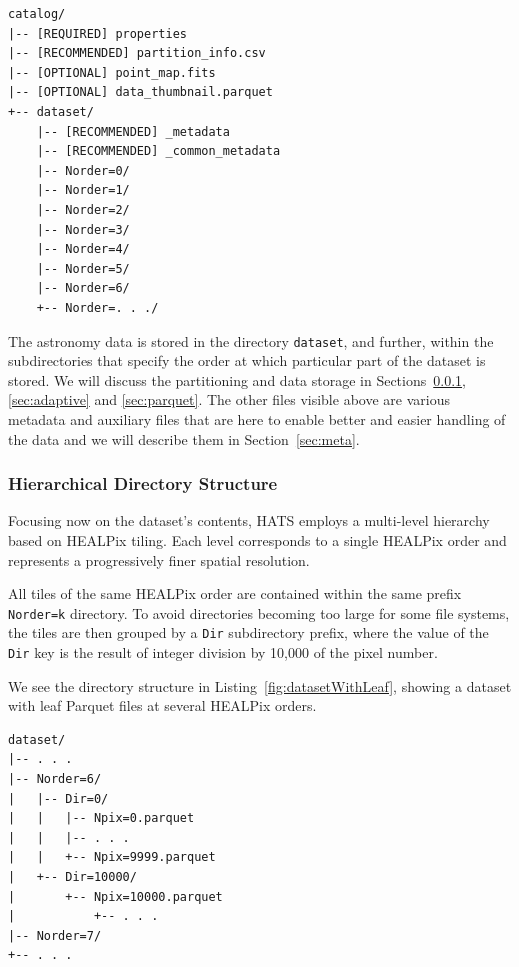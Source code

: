 \documentclass[11pt,a4paper]{ivoa}
\begin{document}
\begin{minipage}{\linewidth}
\begin{lstlisting}[caption=Example catalog directory contents, label=fig:exampleCatalogStructure]
catalog/
|-- [REQUIRED] properties
|-- [RECOMMENDED] partition_info.csv
|-- [OPTIONAL] point_map.fits
|-- [OPTIONAL] data_thumbnail.parquet
+-- dataset/
    |-- [RECOMMENDED] _metadata
    |-- [RECOMMENDED] _common_metadata
    |-- Norder=0/
    |-- Norder=1/
    |-- Norder=2/
    |-- Norder=3/
    |-- Norder=4/
    |-- Norder=5/
    |-- Norder=6/
    +-- Norder=. . ./
\end{lstlisting}
\end{minipage}

The astronomy data is stored in the directory \texttt{dataset}, and further, within the subdirectories that specify the order at which particular part of the dataset is stored. 
We will discuss the partitioning and data storage in Sections~\ref{sec:hierarchical}, \ref{sec:adaptive} and \ref{sec:parquet}. 
The other files visible above are various metadata and auxiliary files that are here to enable better and easier handling of the data and we will describe them in Section~\ref{sec:meta}. 
    
\subsubsection{Hierarchical Directory Structure} \label{sec:hierarchical}
Focusing now on the dataset's contents, HATS employs a multi-level hierarchy based on HEALPix tiling.
Each level corresponds to a single HEALPix order and represents a progressively finer spatial resolution.

All tiles of the same HEALPix order are contained within the same prefix \texttt{Norder=k} directory. 
To avoid directories becoming too large for some file systems, the tiles are then grouped by a \texttt{Dir} subdirectory prefix,
where the value of the \texttt{Dir} key is the result of integer division by 10,000 of the pixel number.

We see the directory structure in Listing~\ref{fig:datasetWithLeaf}, showing a dataset with leaf Parquet files at several HEALPix orders.

\begin{minipage}{\linewidth}
\begin{lstlisting}[caption=Example catalog dataset directory contents, label=fig:datasetWithLeaf]
dataset/
|-- . . .
|-- Norder=6/
|   |-- Dir=0/
|   |   |-- Npix=0.parquet
|   |   |-- . . .
|   |   +-- Npix=9999.parquet
|   +-- Dir=10000/
|       +-- Npix=10000.parquet
|           +-- . . .
|-- Norder=7/
+-- . . .
\end{lstlisting} 
\end{minipage}
\end{document}
